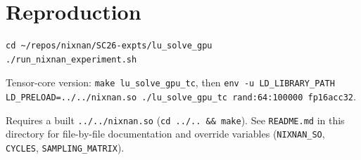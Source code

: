 \documentclass[11pt,a4paper]{article}
\begin{document}
\section*{Reproduction}

\begin{lstlisting}
cd ~/repos/nixnan/SC26-expts/lu_solve_gpu
./run_nixnan_experiment.sh
\end{lstlisting}

\noindent Tensor-core version: \texttt{make lu\_solve\_gpu\_tc}, then \texttt{env -u LD\_LIBRARY\_PATH LD\_PRELOAD=../../nixnan.so ./lu\_solve\_gpu\_tc rand:64:100000 fp16acc32}.

\noindent Requires a built \texttt{../../nixnan.so} (\texttt{cd ../.. \&\& make}).
See \texttt{README.md} in this directory for file-by-file documentation and
override variables (\texttt{NIXNAN\_SO}, \texttt{CYCLES},
\texttt{SAMPLING\_MATRIX}).
\end{document}
